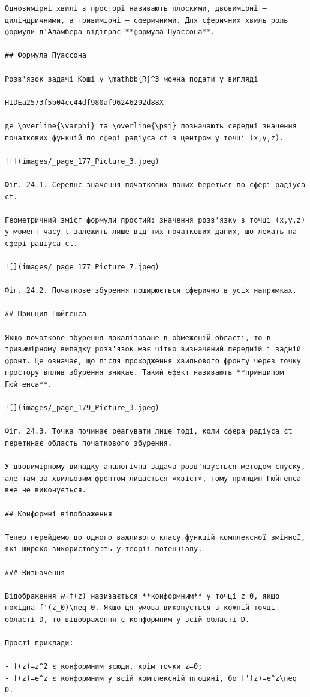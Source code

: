 \documentclass[
  ukrainian,
]{article}
\begin{document}
\begin{verbatim}
Одновимірні хвилі в просторі називають плоскими, двовимірні — циліндричними, а тривимірні — сферичними. Для сферичних хвиль роль формули д'Аламбера відіграє **формула Пуассона**.

## Формула Пуассона

Розв'язок задачі Коші у \mathbb{R}^3 можна подати у вигляді

HIDEa2573f5b04cc44df980af96246292d88X

де \overline{\varphi} та \overline{\psi} позначають середні значення початкових функцій по сфері радіуса ct з центром у точці (x,y,z).

![](images/_page_177_Picture_3.jpeg)

Фіг. 24.1. Середнє значення початкових даних береться по сфері радіуса ct.

Геометричний зміст формули простий: значення розв'язку в точці (x,y,z) у момент часу t залежить лише від тих початкових даних, що лежать на сфері радіуса ct.

![](images/_page_177_Picture_7.jpeg)

Фіг. 24.2. Початкове збурення поширюється сферично в усіх напрямках.

## Принцип Гюйгенса

Якщо початкове збурення локалізоване в обмеженій області, то в тривимірному випадку розв'язок має чітко визначений передній і задній фронт. Це означає, що після проходження хвильового фронту через точку простору вплив збурення зникає. Такий ефект називають **принципом Гюйгенса**.

![](images/_page_179_Picture_3.jpeg)

Фіг. 24.3. Точка починає реагувати лише тоді, коли сфера радіуса ct перетинає область початкового збурення.

У двовимірному випадку аналогічна задача розв'язується методом спуску, але там за хвильовим фронтом лишається «хвіст», тому принцип Гюйгенса вже не виконується.

## Конформні відображення

Тепер перейдемо до одного важливого класу функцій комплексної змінної, які широко використовують у теорії потенціалу.

### Визначення

Відображення w=f(z) називається **конформним** у точці z_0, якщо похідна f'(z_0)\neq 0. Якщо ця умова виконується в кожній точці області D, то відображення є конформним у всій області D.

Прості приклади:

- f(z)=z^2 є конформним всюди, крім точки z=0;
- f(z)=e^z є конформним у всій комплексній площині, бо f'(z)=e^z\neq 0.


\end{verbatim}
\end{document}
